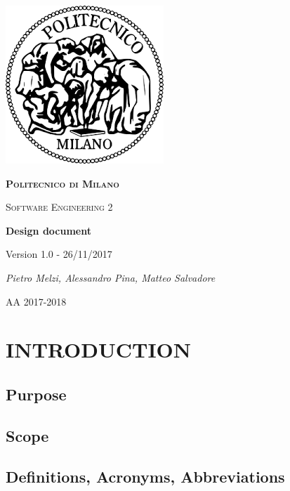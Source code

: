 \documentclass[11pt]{report}
\begin{document}
	\begin{titlepage}
		\centering
		\includegraphics{logo.png}\par\vspace{1cm}
		{\scshape\LARGE\bfseries Politecnico di Milano \par}
		\vspace{1cm}
		{\scshape\Large Software Engineering 2\par}
		\vspace{1.5cm}
		{\Huge\bfseries Design document\par}
		\vspace{1cm}
		{\small Version 1.0 - 26/11/2017\par}
		\vspace{4cm}
		{\Large\itshape Pietro Melzi, Alessandro Pina, Matteo Salvadore\par}

		\vfill

		{\large AA 2017-2018\par}
	\end{titlepage}

	\tableofcontents{}

	\chapter{INTRODUCTION}
	\label{ch:INTRODUCTION}
	
		\section{Purpose}
		\label{sect:Purpose}
			
			
		\section{Scope}
		\label{sect:Scope}
			
		\section{Definitions, Acronyms, Abbreviations}
		\label{sect:Definitions, Acronyms, Abbreviations}
			
			
			
			
\end{document}
